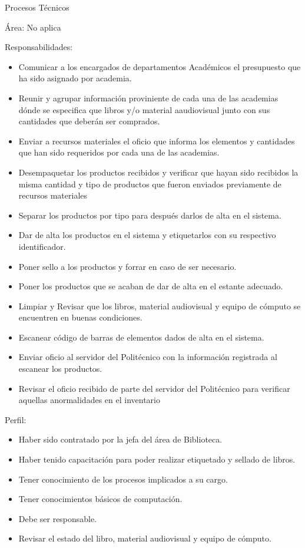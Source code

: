 \begin{Actor}{Procesos Técnicos}{}
	\item[Área:] No aplica
	\item[Responsabilidades:] \hspace{1pt}
	\begin{itemize}
		\item Comunicar a los encargados de departamentos Académicos el presupuesto que ha sido asignado por academia.
		\item Reunir y agrupar información proviniente de cada una de las academias dónde se especifica que libros y/o material aaudiovisual junto con sus cantidades que deberán ser comprados.
		\item Enviar a recursos materiales el oficio que informa los elementos y cantidades que han sido requeridos por cada una de las academias. 
		\item Desempaquetar los productos recibidos y verificar que hayan sido recibidos la misma cantidad y tipo de productos que fueron enviados previamente de recursos materiales
		\item Separar los productos por tipo para después darlos de alta en el sistema.
		\item Dar de alta los productos en el sistema y etiquetarlos con su respectivo identificador.
		\item Poner sello a los productos y forrar en caso de ser necesario.
		\item Poner los productos que se acaban de dar de alta en el estante adecuado.
		\item Limpiar y Revisar que los libros, material audiovisual y equipo de cómputo se encuentren en buenas condiciones.
		\item Escanear código de barras de elementos dados de alta en el sistema.
		\item Enviar oficio al servidor del Politécnico con la información registrada al escanear los productos.
		\item Revisar el oficio recibido de parte del servidor del Politécnico para verificar aquellas anormalidades en el inventario
	\end{itemize}
	\item[Perfil:] \hspace{1pt}
	\begin{itemize}
		\item Haber sido contratado por la jefa del área de Biblioteca.
		\item Haber tenido capacitación para poder realizar etiquetado y sellado de libros.
		\item Tener conocimiento de los procesos implicados a su cargo.
		\item Tener conocimientos básicos de computación.
		\item Debe ser responsable.	
		\item Revisar el estado del libro, material audiovisual y equipo de cómputo.	
	\end{itemize}
\end{Actor}

